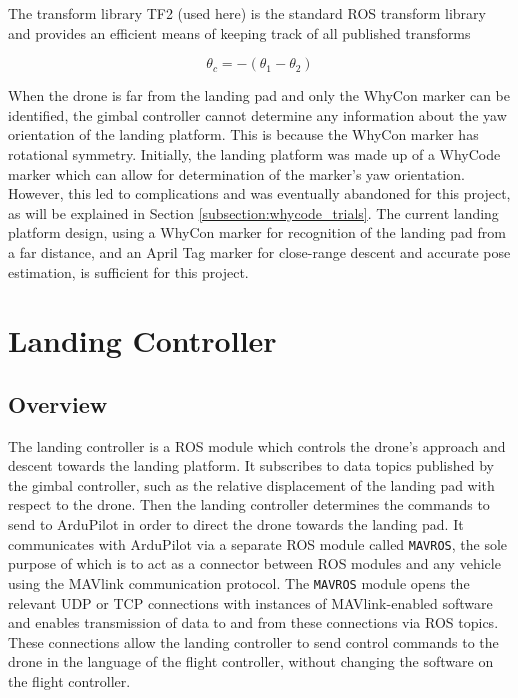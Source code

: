 The transform library TF2 (used here) is the standard ROS transform library and provides an efficient means of keeping track of all published transforms 

\begin{equation}
    \theta_c = -\left( \theta_1 - \theta_2 \right)
    \label{equation:yaw_correction}
\end{equation}

When the drone is far from the landing pad and only the WhyCon marker can be identified, the gimbal controller cannot determine any information about the yaw orientation of the landing platform. This is because the WhyCon marker has rotational symmetry. Initially, the landing platform was made up of a WhyCode marker which can allow for determination of the marker's yaw orientation. However, this led to complications and was eventually abandoned for this project, as will be explained in Section \ref{subsection:whycode_trials}. The current landing platform design, using a WhyCon marker for recognition of the landing pad from a far distance, and an April Tag marker for close-range descent and accurate pose estimation, is sufficient for this project.

\section{Landing Controller}
\label{subsection:landing_controller}

\subsection{Overview}
The landing controller is a \gls{ROS} module which controls the drone's approach and descent towards the landing platform. It subscribes to data topics published by the gimbal controller, such as the relative displacement of the landing pad with respect to the drone. Then the landing controller determines the commands to send to ArduPilot in order to direct the drone towards the landing pad. It communicates with ArduPilot via a separate \gls{ROS} module called \texttt{MAVROS}, the sole purpose of which is to act as a connector between \gls{ROS} modules and any vehicle using the MAVlink communication protocol. The \texttt{MAVROS} module opens the relevant \gls{UDP} or \gls{TCP} connections with instances of MAVlink-enabled software and enables transmission of data to and from these connections via \gls{ROS} topics. These connections allow the landing controller to send control commands to the drone in the language of the flight controller, without changing the software on the flight controller.

